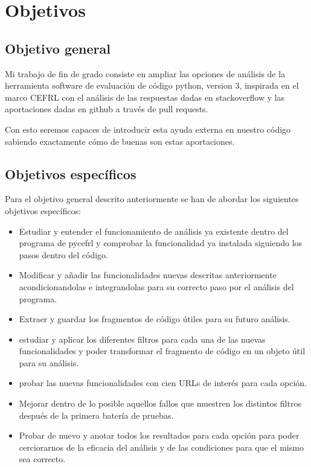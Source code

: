 \documentclass[a4paper, 12pt]{book}
\begin{document}

\cleardoublepage %
\chapter{Objetivos} %
\label{chap:objetivos} %

\section{Objetivo general} %
\label{sec:objetivo-general} %

Mi trabajo de fin de grado consiste en ampliar las opciones de análisis de la herramienta software de evaluación de código python, version 3, inspirada en el marco CEFRL con el análisis de las respuestas dadas en stackoverflow y las aportaciones dadas en github a través de pull requests. 

Con esto seremos capaces de introducir esta ayuda externa en nuestro código sabiendo exactamente cómo de buenas son estas aportaciones.


\section{Objetivos específicos}
\label{sec:objetivos-especificos}

Para el objetivo general descrito anteriormente se han de abordar los siguientes objetivos específicos:

\begin{itemize}
	\item Estudiar y entender el funcionamiento de análisis ya existente dentro del programa de pycefrl y comprobar la funcionalidad ya instalada siguiendo los pasos dentro del código.
	\item Modificar y añadir las funcionalidades nuevas descritas anteriormente acondicionandolas e integrandolas para su correcto paso por el análisis del programa.
	\item Extraer y guardar los fragmentos de código útiles para su futuro análisis.
	\item estudiar y aplicar los diferentes filtros para cada una de las nuevas funcionalidades y poder transformar el fragmento de código en un objeto útil para su análisis.
	\item probar las nuevas funcionalidades con cien URLs de interés para cada opción.
	\item Mejorar dentro de lo posible aquellos fallos que muestren los distintos filtros después de la primera batería de pruebas.
	\item Probar de nuevo y anotar todos los resultados para cada opción para poder cerciorarnos de la eficacia del análisis y de las condiciones para que el mismo sea correcto. 
\end{itemize}
\end{document}
